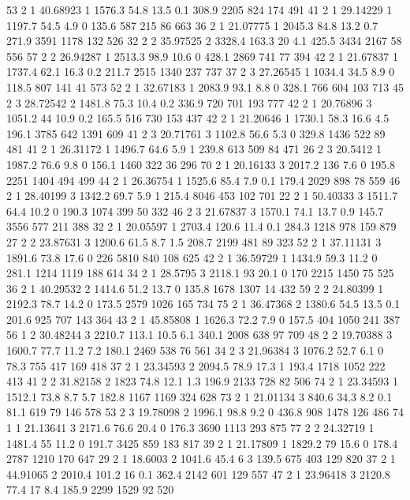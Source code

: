 53	2	1	40.68923	1	1576.3	54.8	13.5	0.1		308.9	2205	824		174		491
41	2	1	29.14229	1	1197.7	54.5	4.9	0	135.6	587		215		86		663
36	2	1	21.07775	1	2045.3	84.8	13.2	0.7		271.9	3591	1178	132		526
32	2	2	35.97525	2	3328.4	163.3	20		4.1		425.5	3434	2167	58		556
57	2	2	26.94287	1	2513.3	98.9	10.6	0		428.1	2869	741		77		394
42	2	1	21.67837	1	1737.4	62.1	16.3	0.2		211.7	2515	1340	237		737
37	2	3	27.26545	1	1034.4	34.5	8.9	0	118.5	807		141		41		573
52	2	1	32.67183	1	2083.9	93.1	8.8	0	328.1	766		604		103		713
45	2	3	28.72542	2	1481.8	75.3	10.4	0.2		336.9	720		701		193		777
42	2	1	20.76896	3	1051.2	44		10.9	0.2		165.5	516		730		153		437
42	2	1	21.20646	1	1730.1	58.3	16.6	4.5		196.1	3785	642		1391	609
41	2	3	20.71761	3	1102.8	56.6	5.3		0		329.8	1436	522		89		481
41	2	1	26.31172	1	1496.7	64.6	5.9		1		239.8	613		509		84		471
26	2	3	20.5412	    1	1987.2	76.6	9.8		0		156.1	1460	322		36		296
70	2	1	20.16133	3	2017.2	136		7.6		0		195.8	2251	1404	494		499
44	2	1	26.36754	1	1525.6	85.4	7.9		0.1		179.4	2029	898		78		559
46	2	1	28.40199	3	1342.2	69.7	5.9		1		215.4	8046	453		102		701
22	2	1	50.40333	3	1511.7	64.4	10.2	0		190.3	1074	399		50		332
46	2	3	21.67837	3	1570.1	74.1	13.7	0.9		145.7	3556	577		211		388
32	2	1	20.05597	1	2703.4	120.6	11.4	0.1		284.3	1218	978		159		879
27	2	2	23.87631	3	1200.6	61.5	8.7		1.5		208.7	2199	481		89		323
52	2	1	37.11131	3	1891.6	73.8	17.6	0		226		5810	840		108		625
42	2	1	36.59729	1	1434.9	59.3	11.2	0		281.1	1214	1119	188		614
34	2	1	28.5795	    3	2118.1	93		20.1	0		170		2215	1450	75		525
36	2	1	40.29532	2	1414.6	51.2	13.7	0		135.8	1678	1307	14		432
59	2	2	24.80399	1	2192.3	78.7	14.2	0		173.5	2579	1026	165		734
75	2	1	36.47368	2	1380.6	54.5	13.5	0.1		201.6	925		707		143		364
43	2	1	45.85808	1	1626.3	72.2	7.9		0		157.5	404		1050	241		387
56	1	2	30.48244	3	2210.7	113.1	10.5	6.1		340.1	2008	638		97		709
48	2	2	19.70388	3	1600.7	77.7	11.2	7.2		180.1	2469	538		76		561
34	2	3	21.96384	3	1076.2	52.7	6.1		0		78.3	755		417		169		418
37	2	1	23.34593	2	2094.5	78.9	17.3	1		193.4	1718	1052	222		413
41	2	2	31.82158	2	1823	74.8	12.1	1.3		196.9	2133	728		82		506
74	2	1	23.34593	1	1512.1	73.8	8.7		5.7		182.8	1167	1169	324		628
73	2	1	21.01134	3	840.6	34.3	8.2		0.1		81.1	619		79		146		578
53	2	3	19.78098	2	1996.1	98.8	9.2		0		436.8	908		1478	126		486
74	1	1	21.13641	3	2171.6	76.6	20.4	0		176.3	3690	1113	293		875
77	2	2	24.32719	1	1481.4	55		11.2	0		191.7	3425	859		183		817
39	2	1	21.17809	1	1829.2	79		15.6	0		178.4	2787	1210	170		647
29	2	1	18.6003	    2	1041.6	45.4	6		3		139.5	675		403		129		820
37	2	1	44.91065	2	2010.4	101.2	16		0.1		362.4	2142	601		129		557
47	2	1	23.96418	3	2120.8	77.4	17		8.4		185.9	2299	1529	92		520
